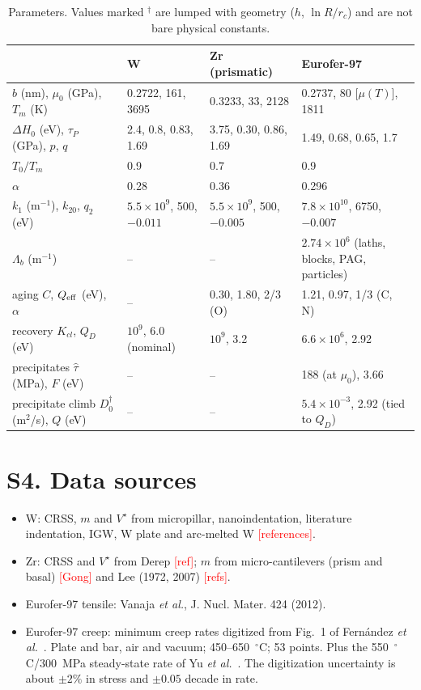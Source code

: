 \documentclass[aps,prl,onecolumn,superscriptaddress,amsmath,amssymb,floatfix]{revtex4-2}
\newcommand{\todo}[1]{\textcolor{red}{[#1]}}
\begin{document}
\begin{table}[h]
\caption{Parameters. Values marked $^\dagger$ are lumped with geometry ($h$, $\ln R/r_c$) and are not bare physical constants.}
\begin{ruledtabular}
\begin{tabular}{llll}
 & W & Zr (prismatic) & Eurofer-97\\
\hline
$b$ (nm), $\mu_0$ (GPa), $T_m$ (K) & 0.2722, 161, 3695 & 0.3233, 33, 2128 & 0.2737, 80 [$\mu(T)$], 1811\\
$\Delta H_0$ (eV), $\tau_P$ (GPa), $p$, $q$ & 2.4, 0.8, 0.83, 1.69 & 3.75, 0.30, 0.86, 1.69 & 1.49, 0.68, 0.65, 1.7\\
$T_0/T_m$ & 0.9 & 0.7 & 0.9\\
$\alpha$ & 0.28 & 0.36 & 0.296\\
$k_1$ (m$^{-1}$), $k_{20}$, $q_2$ (eV) & $5.5\times10^9$, 500, $-0.011$ & $5.5\times10^9$, 500, $-0.005$ & $7.8\times10^{10}$, 6750, $-0.007$\\
$\Lambda_b$ (m$^{-1}$) & -- & -- & $2.74\times10^6$ (laths, blocks, PAG, particles)\\
aging $C$, $Q_{\rm eff}$ (eV), $\alpha$ & -- & 0.30, 1.80, 2/3 (O) & 1.21, 0.97, 1/3 (C, N)\\
recovery $K_{cl}$, $Q_D$ (eV) & $10^9$, 6.0 (nominal) & $10^9$, 3.2 & $6.6\times10^{6}$, 2.92\\
precipitates $\hat\tau$ (MPa), $F$ (eV) & -- & -- & 188 (at $\mu_0$), 3.66\\
precipitate climb $D_0^\dagger$ (m$^2$/s), $Q$ (eV) & -- & -- & $5.4\times10^{-3}$, 2.92 (tied to $Q_D$)\\
\end{tabular}
\end{ruledtabular}
\end{table}

\section{S4. Data sources}
\begin{itemize}
  \item W: CRSS, $m$ and $V^\star$ from micropillar, nanoindentation, literature indentation, IGW, W plate and arc-melted W \todo{references}.
  \item Zr: CRSS and $V^\star$ from Derep \todo{ref}; $m$ from micro-cantilevers (prism and basal) \todo{Gong} and Lee (1972, 2007) \todo{refs}.
  \item Eurofer-97 tensile: Vanaja \emph{et al.}, J. Nucl. Mater. 424 (2012).
  \item Eurofer-97 creep: minimum creep rates digitized from Fig.~1 of Fern\'andez \emph{et al.}~\cite{S_Fern}. Plate and bar, air and vacuum; 450--650~$^\circ$C; 53 points. Plus the 550~$^\circ$C/300~MPa steady-state rate of Yu \emph{et al.}~\cite{S_Yu}. The digitization uncertainty is about $\pm2\%$ in stress and $\pm0.05$ decade in rate.
\end{itemize}
\end{document}
